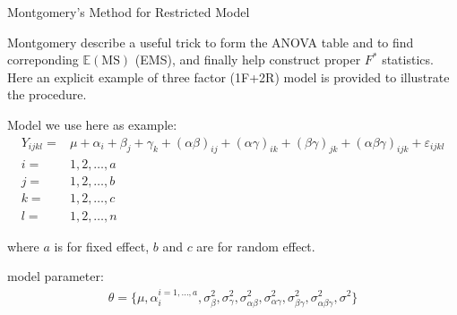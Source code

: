 \begin{point}
    Montgomery's Method for Restricted Model
\end{point}

    Montgomery describe a useful trick to form the ANOVA table and to find correponding $ \mathbb{E}\left( \mathrm{MS} \right)  $ (EMS), and finally help construct proper $ F^* $ statistics.
    Here an explicit example of three factor (1F+2R) model is provided to illustrate the procedure.

    Model we use here as example:
    \begin{align}
         Y_{ijkl}=&\mu +\alpha _i+\beta _j+\gamma _k+(\alpha \beta )_{ij}+(\alpha \gamma )_{ik}+(\beta \gamma )_{jk}+(\alpha \beta \gamma )_{ijk}+\varepsilon _{ijkl}\\
         i=&1,2,\ldots,a\\
         j=&1,2,\ldots,b\\
         k=&1,2,\ldots,c\\
         l=&1,2,\ldots,n
    \end{align}

    where $ a $ is for fixed effect, $ b  $ and $ c  $ are for random effect.
    
    model parameter:
    \begin{align}
        \theta =\{\mu ,\alpha _i^{i=1,\ldots,a}, \sigma _{\beta }^2,\sigma ^2_\gamma ,\sigma ^2_{\alpha \beta },\sigma ^2_{\alpha \gamma },\sigma ^2_{\beta \gamma },\sigma ^2_{\alpha \beta \gamma },\sigma ^2\} 
    \end{align}
    

